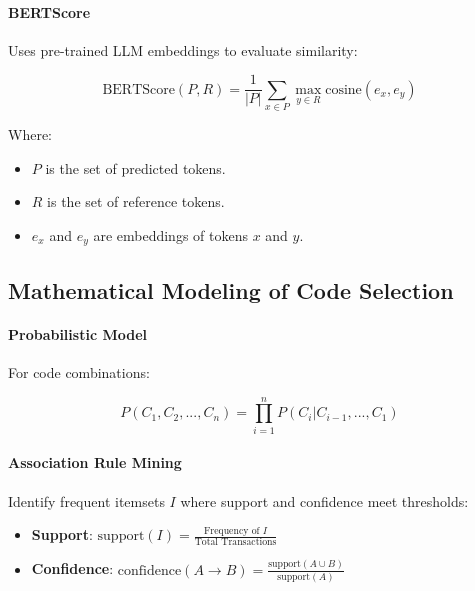 \documentclass[12pt, a4paper]{article}
\begin{document}
\paragraph{BERTScore}

Uses pre-trained LLM embeddings to evaluate similarity:

\begin{equation}
\text{BERTScore}(P, R) = \frac{1}{|P|} \sum_{x \in P} \max_{y \in R} \text{cosine}(e_x, e_y)
\end{equation}

Where:

\begin{itemize}
    \item \( P \) is the set of predicted tokens.
    \item \( R \) is the set of reference tokens.
    \item \( e_x \) and \( e_y \) are embeddings of tokens \( x \) and \( y \).
\end{itemize}

\subsection{Mathematical Modeling of Code Selection}

\paragraph{Probabilistic Model}

For code combinations:

\begin{equation}
P(C_1, C_2, ..., C_n) = \prod_{i=1}^{n} P(C_i | C_{i-1}, ..., C_1)
\end{equation}

\paragraph{Association Rule Mining}

Identify frequent itemsets \( I \) where support and confidence meet thresholds:

\begin{itemize}
    \item \textbf{Support}: \( \text{support}(I) = \frac{\text{Frequency of } I}{\text{Total Transactions}} \)
    \item \textbf{Confidence}: \( \text{confidence}(A \rightarrow B) = \frac{\text{support}(A \cup B)}{\text{support}(A)} \)
\end{itemize}
\end{document}
